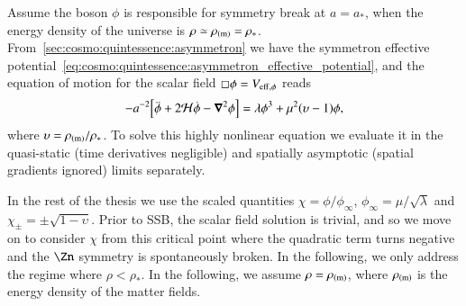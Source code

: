 


\newcommand{\eqregimenum}{\ALIASeqregimenum}
\newcommand{\brchi}{\breve{\chi}}


Assume the boson $\phi$ is responsible for symmetry break at $a=a_\ast$, when the energy density of the universe is $\rho\simeq \rho_\mathrm{(m)}=\rho_\ast$. %
From~\cref{sec:cosmo:quintessence:asymmetron} we have the symmetron effective potential~\cref{eq:cosmo:quintessence:asymmetron_effective_potential}, and the equation of motion for the scalar field $\sq \phi=V_{\mathrm{eff},\phi}$ reads
\begin{equation}
    -a^{-2} {\left[  \ddot{\phi} + 2\mathcal{H} \dot{\phi} - \boldsymbol{\nabla}^2\phi  \right]} = \lambda \phi^3 +\mu^2 {\left(  \upsilon-1 \right)}\phi,
\end{equation}
where $\upsilon=\rho_\mathrm{(m)}/\rho_\ast$. %
To solve this highly nonlinear equation we evaluate it in the quasi-static (time derivatives negligible) and spatially asymptotic (spatial gradients ignored) limits separately. 


In the rest of the thesis we use the scaled quantities $\chi=\phi/\phi_\infty$, $\phi_\infty=\mu/\sqrt{\lambda}$ and $\chi_\pm=\pm\sqrt{1-\upsilon}$. Prior to SSB, the scalar field solution is trivial, and so we move on to consider $\chi$ from this critical point where the quadratic term turns negative and the $\Zn$ symmetry is spontaneously broken. In the following, we only address the regime where $\rho< \rho_\ast$. In the following, we assume $\rho=\rho_\mathrm{(m)}$, where $\rho_\mathrm{(m)}$ is the energy density of the matter fields.  











